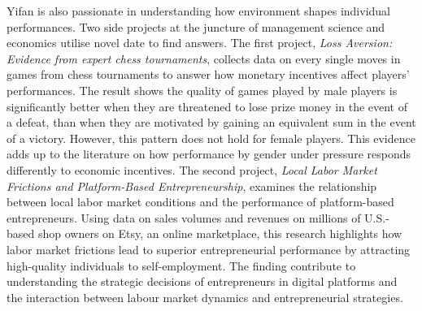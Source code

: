 \documentclass[12pt, letterpaper]{article}
\begin{document}
Yifan is also passionate in understanding how environment shapes individual performances. Two side projects at the juncture of management science and economics utilise novel date to find answers. The first project, \textit{Loss Aversion: Evidence from expert chess tournaments}, collects data on every single moves in games from chess tournaments to answer how monetary incentives affect players' performances. The result shows the quality of games played by male players is significantly better when they are threatened to lose prize money in the event of a defeat, than when they are motivated by gaining an equivalent sum in the event of a victory. However, this pattern does not hold for female players. This evidence adds up to the literature on how performance by gender under pressure responds differently to economic incentives. The second project, \textit{Local Labor Market Frictions and Platform-Based Entrepreneurship}, examines the relationship between local labor market conditions and the performance of platform-based entrepreneurs. Using data on sales volumes and revenues on millions of U.S.-based shop owners on Etsy, an online marketplace, this research highlights how labor market frictions lead to superior entrepreneurial performance by attracting high-quality individuals to self-employment. The finding contribute to understanding the strategic decisions of entrepreneurs in digital platforms and the interaction between labour market dynamics and entrepreneurial strategies.








\end{document}
